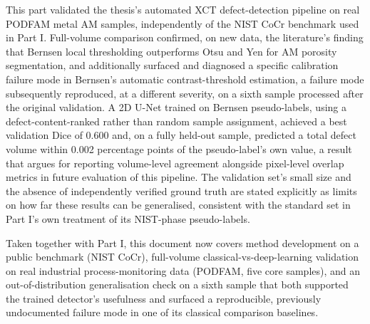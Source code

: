 
This part validated the thesis's automated XCT defect-detection pipeline on real PODFAM metal AM
samples, independently of the NIST CoCr benchmark used in Part I. Full-volume comparison confirmed,
on new data, the literature's finding that Bernsen local thresholding outperforms Otsu and Yen for AM
porosity segmentation, and additionally surfaced and diagnosed a specific calibration failure mode in
Bernsen's automatic contrast-threshold estimation, a failure mode subsequently reproduced, at a
different severity, on a sixth sample processed after the original validation. A 2D U-Net trained on
Bernsen pseudo-labels, using a defect-content-ranked rather than random sample assignment, achieved a
best validation Dice of 0.600 and, on a fully held-out sample, predicted a total defect volume within
0.002 percentage points of the pseudo-label's own value, a result that argues for reporting
volume-level agreement alongside pixel-level overlap metrics in future evaluation of this pipeline.
The validation set's small size and the absence of independently verified ground truth are stated
explicitly as limits on how far these results can be generalised, consistent with the standard set in
Part I's own treatment of its NIST-phase pseudo-labels.

Taken together with Part I, this document now covers method development on a public benchmark (NIST
CoCr), full-volume classical-vs-deep-learning validation on real industrial process-monitoring data
(PODFAM, five core samples), and an out-of-distribution generalisation check on a sixth sample that
both supported the trained detector's usefulness and surfaced a reproducible, previously undocumented
failure mode in one of its classical comparison baselines.
